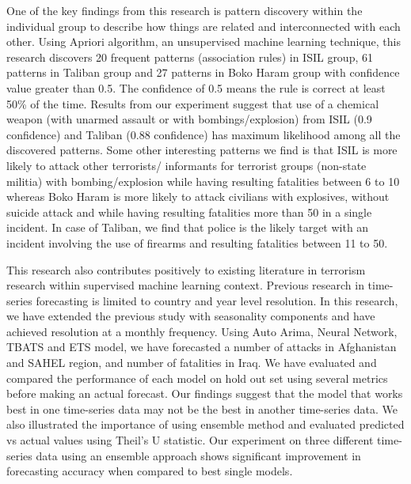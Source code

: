 \documentclass[11pt,oneside,a4paper]{reedthesis}
\begin{document}
One of the key findings from this research is pattern discovery within
the individual group to describe how things are related and
interconnected with each other. Using Apriori algorithm, an unsupervised
machine learning technique, this research discovers 20 frequent patterns
(association rules) in ISIL group, 61 patterns in Taliban group and 27
patterns in Boko Haram group with confidence value greater than 0.5. The
confidence of 0.5 means the rule is correct at least 50\% of the time.
Results from our experiment suggest that use of a chemical weapon (with
unarmed assault or with bombings/explosion) from ISIL (0.9 confidence)
and Taliban (0.88 confidence) has maximum likelihood among all the
discovered patterns. Some other interesting patterns we find is that
ISIL is more likely to attack other terrorists/ informants for terrorist
groups (non-state militia) with bombing/explosion while having resulting
fatalities between 6 to 10 whereas Boko Haram is more likely to attack
civilians with explosives, without suicide attack and while having
resulting fatalities more than 50 in a single incident. In case of
Taliban, we find that police is the likely target with an incident
involving the use of firearms and resulting fatalities between 11 to 50.

This research also contributes positively to existing literature in
terrorism research within supervised machine learning context. Previous
research in time-series forecasting is limited to country and year level
resolution. In this research, we have extended the previous study with
seasonality components and have achieved resolution at a monthly
frequency. Using Auto Arima, Neural Network, TBATS and ETS model, we
have forecasted a number of attacks in Afghanistan and SAHEL region, and
number of fatalities in Iraq. We have evaluated and compared the
performance of each model on hold out set using several metrics before
making an actual forecast. Our findings suggest that the model that
works best in one time-series data may not be the best in another
time-series data. We also illustrated the importance of using ensemble
method and evaluated predicted vs actual values using Theil's U
statistic. Our experiment on three different time-series data using an
ensemble approach shows significant improvement in forecasting accuracy
when compared to best single models.
\end{document}
